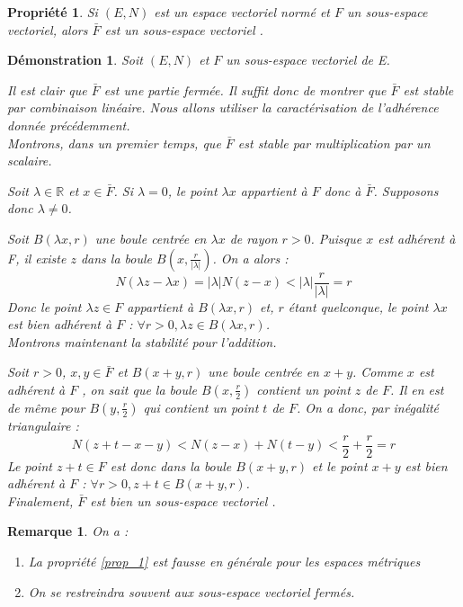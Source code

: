 \documentclass[a4paper, oneside]{report}
\theoremstyle{break}
\newtheorem{propr}[thm]{Propriété}
\newtheorem*{demo}{Démonstration}
\newtheorem{remar}[thm]{Remarque}
\newcommand{\R}{\mathbb{R}}
\newcommand{\sev}{sous-espace vectoriel }
\newcommand{\ev}{espace vectoriel }
\begin{document}
\begin{propr}
\label{prop_2}
Si $(E,N)$ est un \ev normé et $F$ un sous-espace vectoriel, alors $\bar{F}$ est un \sev.
\end{propr}



\begin{demo}
Soit $(E,N)$ et $F$ un \sev de E. 

Il est clair que $\bar{F}$ est une partie fermée. Il suffit donc de montrer que $\bar{F}$ est stable par combinaison linéaire. Nous allons utiliser la caractérisation de l'adhérence donnée précédemment. \\

Montrons, dans un premier temps, que $\bar{F}$ est stable par multiplication par un scalaire. 

Soit $\lambda \in \R$ et $x \in \bar{F}$. Si $\lambda = 0$, le point $\lambda x$ appartient à $F$ donc à $\bar{F}$. Supposons donc $\lambda \neq 0$.

Soit $B(\lambda x, r)$ une boule centrée en $\lambda x$ de rayon $r > 0$. Puisque $x$ est adhérent à F, il existe $z$ dans la boule $B(x,\frac{r}{|\lambda|})$. On a alors :
$$N(\lambda z - \lambda x) = |\lambda|N(z-x) < |\lambda|\frac{r}{|\lambda|} = r$$
Donc le point $\lambda z\in F$ appartient à $B(\lambda x, r)$ et, $r$ étant quelconque, le point $\lambda x$ est bien adhérent à $F$ : $\forall r>0, \lambda z\in B(\lambda x, r)$.\\

Montrons maintenant la stabilité pour l'addition.

Soit $r>0$, $x,y\in \bar{F}$ et $B(x+y,r)$ une boule centrée en $x + y$. Comme $x$ est adhérent à $F$ , on sait que
la boule $B(x, \frac{r}{2})$ contient un point $z$ de $F$. Il en est de même pour $B(y, \frac{r}{2})$ qui contient un point $t$ de $F$. On a donc, par inégalité triangulaire : $$N(z+t-x-y)< N(z-x)+N(t-y)<\frac{r}{2} + \frac{r}{2} = r$$
Le point $z + t\in F$ est donc dans la boule $B(x + y, r)$ et le point $x + y$ est bien adhérent à $F$ : $\forall r>0, z+t\in B(x+y, r)$.\\

Finalement, $\bar{F}$ est bien un \sev.
\end{demo}



\begin{remar}
On a :
\begin{enumerate}
\item La propriété \ref{prop_1} est fausse en générale pour les espaces métriques
\item On se restreindra souvent aux \sev fermés.
\end{enumerate}
\end{remar}
\end{document}
